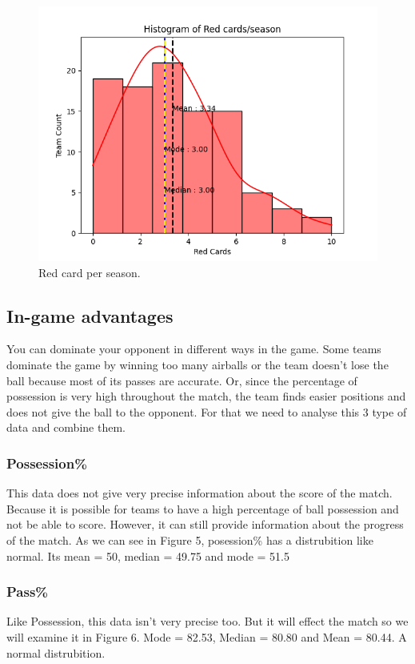 \documentclass[conference]{IEEEtran}
\begin{document}
\begin{figure}[h]
  \includegraphics[width=\linewidth]{RedCardFigure.png}
  \caption{Red card per season.}
  \label{fig:yc}
\end{figure}

\subsection{In-game advantages}
You can dominate your opponent in different ways in the game. Some teams dominate the game by winning too many airballs or the team doesn't lose the ball because most of its passes are accurate. Or, since the percentage of possession is very high throughout the match, the team finds easier positions and does not give the ball to the opponent. For that we need to analyse this 3 type of data and combine them.
\subsubsection{Possession\%}
This data does not give very precise information about the score of the match. Because it is possible for teams to have a high percentage of ball possession and not be able to score. However, it can still provide information about the progress of the match. As we can see in Figure 5, posession\% has a distrubition like normal. Its mean = 50, median = 49.75 and mode = 51.5
\subsubsection{Pass\%}
Like Possession, this data isn't very precise too. But it will effect the match so we will examine it in Figure 6. Mode = 82.53, Median = 80.80 and Mean = 80.44. A normal distrubition.
\end{document}
